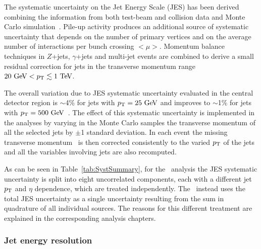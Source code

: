 The systematic uncertainty on the Jet Energy Scale (JES) 
has been derived combining the information from both test-beam 
and collision data and Monte Carlo
simulation~\cite{jes, insitu5,insitu6}.  
Pile-up activity produces an additional source of systematic 
uncertainty that depends on the number of primary vertices
and on the average number of interactions per bunch crossing $<\mu>$. 
Momentum balance techniques in $Z$+jets, $\gamma$+jets and 
multi-jet events are combined to derive a small residual correction
for jets in the transverse momentum range $20\gev<\pt\lesssim 1\tev$.

The overall variation due to JES systematic uncertainty 
evaluated in the central detector region 
is $\sim$4\% for jets with $\pt=25\gev$ and improves to $\sim$1\% for  
jets with $\pt=500\gev$~\cite{jesuncertainty}.
The effect of this systematic uncertainty is 
implemented in the analyses by varying in the Monte Carlo samples the 
transverse momentum of all the selected jets by $\pm$1 standard deviation.
In each event the missing transverse momentum \met\ is then corrected consistently to 
the varied $\pt$ of the jets and all the variables involving jets are also
recomputed.

As can be seen in Table~\ref{tab:SystSummary}, for the \htx\ analysis
the JES systematic uncertainty is split into eight
uncorrelated components, each with a different jet $\pt$ and $\eta$
dependence, which are treated independently.
The \wbx\ instead uses the total JES uncertainty as a single uncertainty
resulting from the sum in quadrature of all individual sources.
The reasons for this different treatment are explained in the
corresponding analysis chapters.


\subsubsection{Jet energy resolution}
\label{sec:syst_jer}

